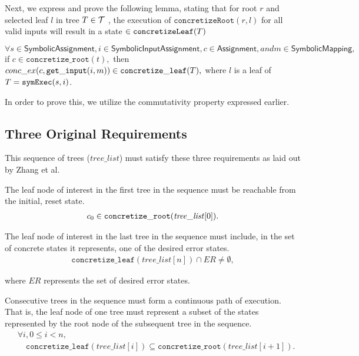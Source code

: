 Next, we express and prove the following lemma, stating that for root $r$ and selected leaf $l$ in tree $T \in \mathcal{T}$ , the execution of $\mathtt{concretizeRoot}(r,l)$ for all valid inputs will result in a state $\in \mathtt{concretizeLeaf}(T)$
\begin{lemma} \label{cop}
$\forall s \in \textsf{SymbolicAssignment}, i \in \textsf{SymbolicInputAssignment}, c \in \textsf{Assignment}, and m \in \textsf{SymbolicMapping},$
if $c \in \mathtt{concretize\_root}(t),$
then 
$conc\_ex(c, \mathtt{get\_input} (i, m)) \in \mathtt{concretize\_leaf}(T),$
where $l$ is a leaf of $T =  \mathtt{symExec}(s, i)$.
\end{lemma} 

In order to prove this, we utilize the commutativity property expressed earlier.

\subsection{Three Original Requirements} This sequence of trees ($\mathit{tree\_list}$)
must satisfy these three requirements as laid out by Zhang et al.
\setcounter{property}{0}
\renewcommand{\theproperty}{Z.\arabic{property}}
\begin{property}
  \label{prop:startinit} The leaf node of interest in the first tree in the
  sequence must be reachable from the initial, reset state.
  \begin{align*}
    c_0 \in \mathtt{concretize\_root}(\mathit{tree\_list}[0]).
  \end{align*}
\end{property}

\begin{property}
  \label{prop:enderror} The leaf node of interest in the last tree in the
  sequence must include, in the set of concrete states it represents, one of the
  desired error states. 
  \begin{align*}
    \mathtt{concretize\_leaf}(\mathit{tree\_list}[n]) \cap \mathit{ER} \neq
    \emptyset,
  \end{align*}
\end{property}
where $\mathit{ER}$ represents the set of desired error states.

\begin{property}
  \label{prop:stitch}
  Consecutive trees in the sequence must form a continuous path of
  execution. That is, the leaf node of one tree must represent a subset of the
  states represented by the root node of the subsequent tree in the sequence.
  \begin{align*}
    &\forall i, 0 \le i < n,\\
    &\quad\mathtt{concretize\_leaf}(\mathit{tree\_list}[i]) \subseteq
\mathtt{concretize\_root}(\mathit{tree\_list}[i+1]).
\end{align*}

\end{property}

